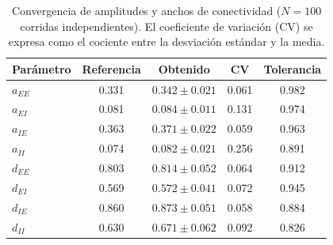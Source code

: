 \begin{table}[H]
\centering
\caption{Convergencia de amplitudes y anchos de conectividad ($N = 100$ corridas independientes). El coeficiente de variación (CV) se expresa como el cociente entre la desviación estándar y la media.}
\label{tab:connectivity_amplitudes}
\begin{tabular}{lcccc}
\toprule
\textbf{Parámetro} & \textbf{Referencia} & \textbf{Obtenido} & \textbf{CV} & \textbf{Tolerancia} \\
\midrule
$a_{EE}$ & 0.331 & $0.342 \pm 0.021$ & 0.061 & 0.982 \\
$a_{EI}$ & 0.081 & $0.084 \pm 0.011$ & 0.131 & 0.974 \\
$a_{IE}$ & 0.363 & $0.371 \pm 0.022$ & 0.059 & 0.963 \\
$a_{II}$ & 0.074 & $0.082 \pm 0.021$ & 0.256 & 0.891 \\
$d_{EE}$ & 0.803 & $0.814 \pm 0.052$ & 0.064 & 0.912 \\
$d_{EI}$ & 0.569 & $0.572 \pm 0.041$ & 0.072 & 0.945 \\
$d_{IE}$ & 0.860 & $0.873 \pm 0.051$ & 0.058 & 0.884 \\
$d_{II}$ & 0.630 & $0.671 \pm 0.062$ & 0.092 & 0.826 \\
\bottomrule
\end{tabular}
\end{table}



